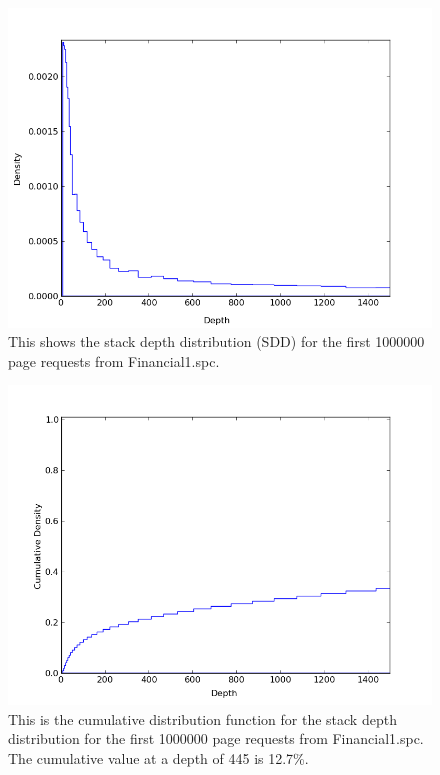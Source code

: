   \begin{figure}
  \centering
  \includegraphics[width=6in]{../media/sdd_financial2_0-1000000.png}
  \caption[SDD of trace Financial2.spc]{This shows the stack depth
  distribution (SDD) for the first 1000000 page requests from Financial1.spc.}
  \label{fig:sdd_financial2}
  \end{figure}

  \begin{figure}
  \centering
  \includegraphics[width=6in]{../media/sdd_cdf_financial2_0-1000000.png}
  \caption[CDF for the SDD of trace Financial2.spc]{This is the cumulative
  distribution function for the stack depth distribution for the first 1000000
  page requests from Financial1.spc. The cumulative value at a depth of 445 is
  12.7\%.}
  \label{fig:sdd_cdf_financial2}
  \end{figure}

